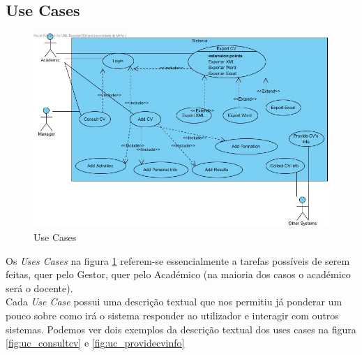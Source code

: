 \documentclass[a4paper,11pt,openright,openbib]{article}
\begin{document}
\subsection{Use Cases}
\begin{figure}[!ht]
\centering
\includegraphics[scale=.6]{Use_Cases.jpg}
\caption{Use Cases}
\label{fig:usecases}
\end{figure}
Os \emph{Uses Cases} na figura \ref{fig:usecases} referem-se essencialmente a tarefas possíveis de serem feitas, quer pelo Gestor, quer pelo Académico (na maioria dos casos o académico será o docente).\\
Cada \emph{Use Case} possui uma descrição textual que nos permitiu já ponderar um pouco sobre como irá o sistema responder ao utilizador e interagir com outros sistemas. Podemos ver dois exemplos da descrição textual dos uses cases na figura \ref{fig:uc_consultcv} e \ref{fig:uc_providecvinfo}
\end{document}
